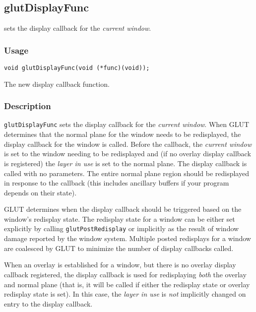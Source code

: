 \subsection{glutDisplayFunc}

 sets the display callback for the {\em current window}.

\subsubsection*{Usage}

\begin{verbatim}
void glutDisplayFunc(void (*func)(void));
\end{verbatim}
\begin{description}
\itemsep 0in
\item[{\tt func}]
The new display callback function.
\end{description}

\subsubsection*{Description}

{\tt glutDisplayFunc} sets the display callback for the {\em current
window}.  When GLUT determines that the normal plane for the window needs
to be redisplayed, the display callback for the window is called.  Before the callback,
the {\em current window} is set to the window needing to be
redisplayed and (if no overlay display callback is registered) the {\em layer in use}
is set to the normal plane.  The display callback is called with no parameters.  The
entire normal plane region should be redisplayed in response to the callback (this
includes ancillary buffers if your program depends on their state).

GLUT determines when the display callback should be triggered based on
the window's redisplay state.  The redisplay state for a window can
be either set explicitly by calling {\tt glutPostRedisplay} or implicitly
as the result of window damage reported by the window system.
Multiple posted redisplays for a window are
coalesced by GLUT to minimize the number of display callbacks called.

When an overlay is established for a window, but there is no overlay display
callback registered, the display callback is used for redisplaying
{\em both} the overlay and normal
plane (that is, it will be called if either the redisplay
state or overlay redisplay state is set).  In this case, the {\em layer in use} is {\em not}
implicitly changed on entry to the display callback.

